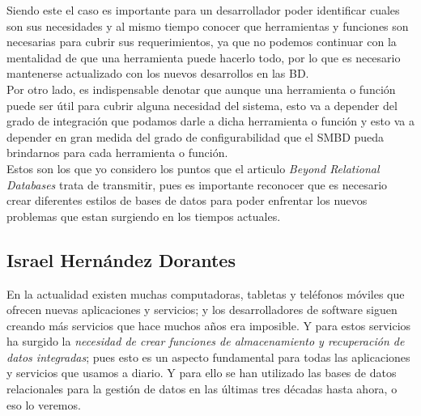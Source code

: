 \documentclass[12pt]{article}
\begin{document}
    Siendo este el caso es importante para un desarrollador poder identificar cuales son sus necesidades y al mismo tiempo conocer que herramientas y funciones son necesarias para cubrir sus requerimientos, ya que no podemos continuar con la mentalidad de que una herramienta puede hacerlo todo, por lo que es necesario mantenerse actualizado con los nuevos desarrollos en las BD.\\

    Por otro lado, es indispensable denotar que aunque una herramienta o función puede ser útil para cubrir alguna necesidad del sistema, esto va a depender del grado de integración que podamos darle a dicha herramienta o función y esto va a depender en gran medida del grado de configurabilidad que el SMBD pueda brindarnos para cada herramienta o función.\\

    Estos son los que yo considero los puntos que el articulo \textit{Beyond Relational Databases} trata de transmitir, pues es importante reconocer que es necesario crear diferentes estilos de bases de datos para poder enfrentar los nuevos problemas que estan surgiendo en los tiempos actuales.\\

\newpage
\subsection*{Israel Hernández Dorantes}

En la actualidad existen muchas computadoras, tabletas y teléfonos móviles que ofrecen nuevas aplicaciones y servicios; y los desarrolladores de software siguen creando más servicios que hace muchos años era imposible. Y para estos servicios ha surgido la \textit{necesidad de crear funciones de almacenamiento y recuperación de datos integradas}; pues esto es un aspecto fundamental para todas las aplicaciones y servicios que usamos a diario. Y para ello se han utilizado las bases de datos relacionales para la gestión de datos en las últimas tres décadas hasta ahora, o eso lo veremos.\\
\end{document}
